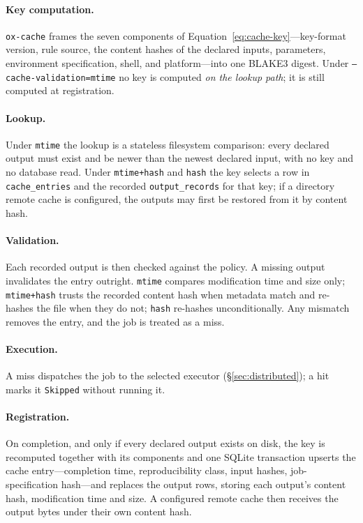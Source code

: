 \documentclass[12pt,a4paper]{article}
\newcommand{\code}[1]{{\texttt{\small\color{inlinecode}#1}}}
\begin{document}
\paragraph{Key computation.}
\code{ox-cache} frames the seven components of
Equation~\ref{eq:cache-key}---key-format version, rule source, the
content hashes of the declared inputs, parameters, environment
specification, shell, and platform---into one BLAKE3 digest. Under
\code{--cache-validation=mtime} no key is computed \emph{on the lookup
path}; it is still computed at registration.

\paragraph{Lookup.}
Under \code{mtime} the lookup is a stateless filesystem comparison:
every declared output must exist and be newer than the newest declared
input, with no key and no database read. Under \code{mtime+hash} and
\code{hash} the key selects a row in \code{cache\_entries} and the
recorded \code{output\_records} for that key; if a directory remote
cache is configured, the outputs may first be restored from it by
content hash.

\paragraph{Validation.}
Each recorded output is then checked against the policy. A missing
output invalidates the entry outright. \code{mtime} compares
modification time and size only; \code{mtime+hash} trusts the recorded
content hash when metadata match and re-hashes the file when they do
not; \code{hash} re-hashes unconditionally. Any mismatch removes the
entry, and the job is treated as a miss.

\paragraph{Execution.}
A miss dispatches the job to the selected executor
(\S\ref{sec:distributed}); a hit marks it \code{Skipped} without running
it.

\paragraph{Registration.}
On completion, and only if every declared output exists on disk, the
key is recomputed together with its components and one SQLite
transaction upserts the cache entry---completion time, reproducibility
class, input hashes, job-specification hash---and replaces the output
rows, storing each output's content hash, modification time and size.
A configured remote cache then receives the output bytes under their
own content hash.
\end{document}
